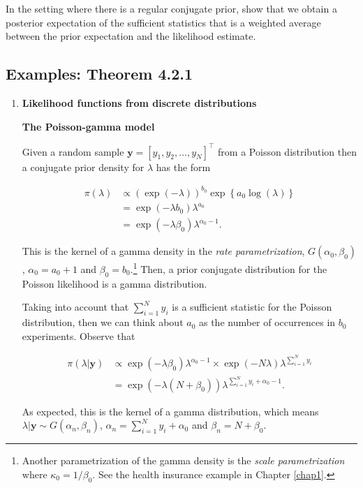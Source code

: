In the setting where there is a regular conjugate prior, \cite{diaconis1979conjugate} show that we obtain a posterior expectation of the sufficient statistics that is a weighted average between the prior expectation and the likelihood estimate. 

\subsection{Examples: Theorem 4.2.1}\label{sec421}

\begin{enumerate}
	\item \textbf{Likelihood functions from discrete distributions}

\textbf{The Poisson-gamma model}

Given a random sample $\mathbf{y}=[y_1,y_2,\dots,y_N]^{\top}$ from a Poisson distribution then a conjugate prior density for $\lambda$ has the form 

\begin{align}
	\pi(\lambda)&\propto \left(\exp(-\lambda)\right)^{b_0} \exp\left\{a_0\log(\lambda)\right\}\nonumber\\
	& = \exp(-\lambda b_0) \lambda^{a_0}\nonumber\\
	& = \exp(-\lambda \beta_0) \lambda^{\alpha_0-1}.\nonumber
\end{align}

This is the kernel of a gamma density in the \textit{rate parametrization}, $G(\alpha_0,\beta_0)$, $\alpha_0=a_0+1$ and $\beta_0=b_0$.\footnote{Another parametrization of the gamma density is the \textit{scale parametrization} where $\kappa_0=1/\beta_0$. See the health insurance example in Chapter \ref{chap1}.} Then, a prior conjugate distribution for the Poisson likelihood is a gamma distribution.   

Taking into account that $\sum_{i=1}^N y_i$ is a sufficient statistic for the Poisson distribution, then we can think about $a_0$ as the number of occurrences in $b_0$ experiments. 
Observe that

\begin{align}
	\pi(\lambda|\mathbf{y})&\propto \exp(-\lambda \beta_0) \lambda^{\alpha_0-1} \times \exp(-N\lambda)\lambda^{\sum_{i=1}^Ny_i}\nonumber\\
	&= \exp(-\lambda(N+\beta_0)) \lambda^{\sum_{i=1}^Ny_i+\alpha_0-1}.\nonumber 
\end{align}

As expected, this is the kernel of a gamma distribution, which means $\lambda|\mathbf{y}\sim G(\alpha_n,\beta_n)$, $\alpha_n=\sum_{i=1}^Ny_i+\alpha_0$ and $\beta_n=N+\beta_0$.


\end{enumerate}
